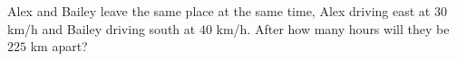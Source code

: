 Alex and Bailey leave the same place at the same time, Alex driving east at $30$ km/h and Bailey driving south at $40$ km/h. After how many hours will they be $225$ km apart?
